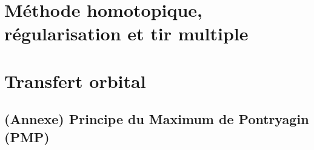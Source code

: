 \documentclass[11pt,onecolumn,twoside]{style_tp}
\makeatletter
\def\repRessource{ressources}
\renewcommand{\@chapapp}{\textsc{Sujet}}
\makeatother
\begin{document}
\chapter{M\'ethode homotopique, r\'egularisation et tir multiple}
\label{chap:homotopie}


\chapter{Transfert orbital}
\label{chap:transfert_orbital}



\makeatletter
\renewcommand{\@chapapp}{\textsc{Annexe}}
\makeatother

\begin{appendix}

\chapter{(Annexe) Principe du Maximum de Pontryagin (PMP)}
\label{chap:pmp_fort}


\end{appendix}
\end{document}
